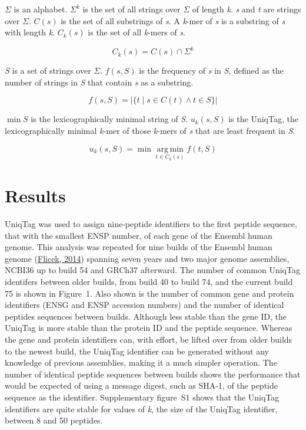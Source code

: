 \documentclass{bioinfo}
\begin{document}
$\Sigma$ is an alphabet. $\Sigma^k$ is the set of all strings over
$\Sigma$ of length \emph{k}. \emph{s} and \emph{t} are strings over
$\Sigma$. $C(s)$ is the set of all substrings of \emph{s}. A
\emph{k}-mer of \emph{s} is a substring of \emph{s} with length
\emph{k}. $C_k(s)$ is the set of all \emph{k}-mers of \emph{s}.

\[
C_k(s) = C(s) \cap \Sigma^k
\]

\emph{S} is a set of strings over $\Sigma$. $f(s, S)$ is the frequency
of \emph{s} in \emph{S}, defined as the number of strings in \emph{S}
that contain \emph{s} as a substring.

\[
f(s, S) = \left\vert \{ t \mid s \in C(t) \wedge t \in S \} \right\vert
\]

$\min S$ is the lexicographically minimal string of \emph{S}.
$u_k(s, S)$ is the UniqTag, the lexicographically minimal \emph{k}-mer
of those \emph{k}-mers of \emph{s} that are least frequent in \emph{S}.

\[
u_k(s, S) = \min \mathop{\arg\,\min}\limits_{t \in C_k(s)} f(t, S)
\]

\section{Results}\label{results}

UniqTag was used to assign nine-peptide identifiers to the first peptide
sequence, that with the smallest ENSP number, of each gene of the
Ensembl human genome. This analysis was repeated for nine builds of the
Ensembl human genome
(\href{http://dx.doi.org/10.1093/nar/gkt1196}{Flicek, 2014}) spanning
seven years and two major genome assemblies, NCBI36 up to build 54 and
GRCh37 afterward. The number of common UniqTag identifers between older
builds, from build 40 to build 74, and the current build 75 is shown in
Figure~1. Also shown is the number of common gene and protein
identifiers (ENSG and ENSP accession numbers) and the number of
identical peptides sequences between builds. Although less stable than
the gene ID, the UniqTag is more stable than the protein ID and the
peptide sequence. Whereas the gene and protein identifiers can, with
effort, be lifted over from older builds to the newest build, the
UniqTag identifier can be generated without any knowledge of previous
assemblies, making it a much simpler operation. The number of identical
peptide sequences between builds shows the performance that would be
expected of using a message digest, such as SHA-1, of the peptide
sequence as the identifier. Supplementary figure~S1 shows that the
UniqTag identifiers are quite stable for values of \emph{k}, the size of
the UniqTag identifier, between 8 and 50 peptides.
\end{document}
